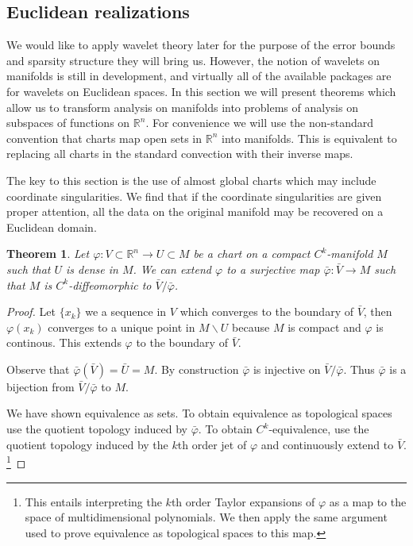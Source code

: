 \documentclass[letterpaper, 10 pt, conference]{ieeeconf}
\newcommand{\R}{\mathbb{R}}
\newtheorem{thm}{Theorem}[section]
\begin{document}
\subsection{Euclidean realizations}
\label{sec:euclidean}
  We would like to apply wavelet theory later for the purpose of the
  error bounds and sparsity structure they will bring us.
  However, the notion of wavelets on manifolds is still in development,
  and virtually all of the available packages are for wavelets on
  Euclidean spaces.
  In this section we will present theorems which allow
  us to transform analysis on manifolds into problems
  of analysis on subspaces of functions on $\R^n$.
  For convenience we will use the non-standard convention
  that charts map open sets in $\R^n$ into manifolds.
  This is equivalent to replacing all charts in the standard
  convection with their inverse maps.

  The key to this section is the use of almost global charts
  which may include coordinate singularities.
  We find that if the coordinate singularities are given
  proper attention, all the data on the original manifold
  may be recovered on a Euclidean domain.

\begin{thm} \label{thm:Euclidean}
  Let $\varphi : V \subset \R^n \to U \subset M$ be a chart on 
  a compact $C^k$-manifold $M$ such that $U$ is dense in $M$.
  We can extend $\varphi$ to a surjective map
  $\bar{\varphi}: \bar{V} \to M$ such that
  $M$ is $C^k$-diffeomorphic to $\bar{V} / \bar{\varphi}$.
\end{thm}
\begin{proof}
  Let $\{x_k\}$ we a sequence in $V$ which converges to the boundary
  of $\bar{V}$, then $\varphi(x_k)$ converges to a unique point in
  $M \backslash U$ because $M$ is compact and $\varphi$ is continous.
  This extends $\varphi$ to the boundary of $\bar{V}$.

  Observe that $\bar{\varphi}( \bar{V} ) = \bar{U} = M$.
  By construction $\bar{\varphi}$ is injective on $\bar{V} / \bar{\varphi}$.
  Thus $\bar{\varphi}$ is a bijection from $\bar{V} / \bar{\varphi}$ to $M$.
  
  We have shown equivalence as sets.
  To obtain equivalence as topological spaces use
  the quotient topology induced by $\bar{\varphi}$.
  To obtain $C^k$-equivalence, use the quotient topology
  induced by the $k$th order jet of $\varphi$
  and continuously extend to $\bar{V}$.
  \footnote{This entails interpreting the $k$th order Taylor expansions
  of $\varphi$ as  a map to the space of multidimensional polynomials.
  We then apply the same argument used to prove equivalence as topological
  spaces to this map.}
\end{proof}
\end{document}
